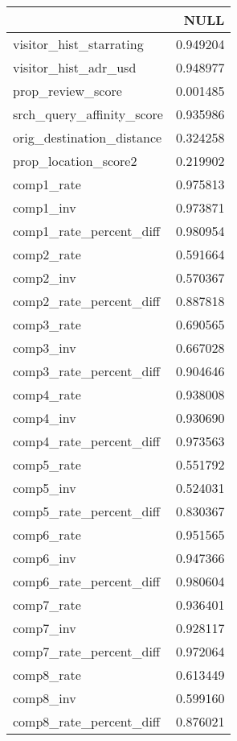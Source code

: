 \begin{tabular}{lr}
\toprule
 & NULL \\
\midrule
visitor_hist_starrating & 0.949204 \\
visitor_hist_adr_usd & 0.948977 \\
prop_review_score & 0.001485 \\
srch_query_affinity_score & 0.935986 \\
orig_destination_distance & 0.324258 \\
prop_location_score2 & 0.219902 \\
comp1_rate & 0.975813 \\
comp1_inv & 0.973871 \\
comp1_rate_percent_diff & 0.980954 \\
comp2_rate & 0.591664 \\
comp2_inv & 0.570367 \\
comp2_rate_percent_diff & 0.887818 \\
comp3_rate & 0.690565 \\
comp3_inv & 0.667028 \\
comp3_rate_percent_diff & 0.904646 \\
comp4_rate & 0.938008 \\
comp4_inv & 0.930690 \\
comp4_rate_percent_diff & 0.973563 \\
comp5_rate & 0.551792 \\
comp5_inv & 0.524031 \\
comp5_rate_percent_diff & 0.830367 \\
comp6_rate & 0.951565 \\
comp6_inv & 0.947366 \\
comp6_rate_percent_diff & 0.980604 \\
comp7_rate & 0.936401 \\
comp7_inv & 0.928117 \\
comp7_rate_percent_diff & 0.972064 \\
comp8_rate & 0.613449 \\
comp8_inv & 0.599160 \\
comp8_rate_percent_diff & 0.876021 \\
\bottomrule
\end{tabular}
